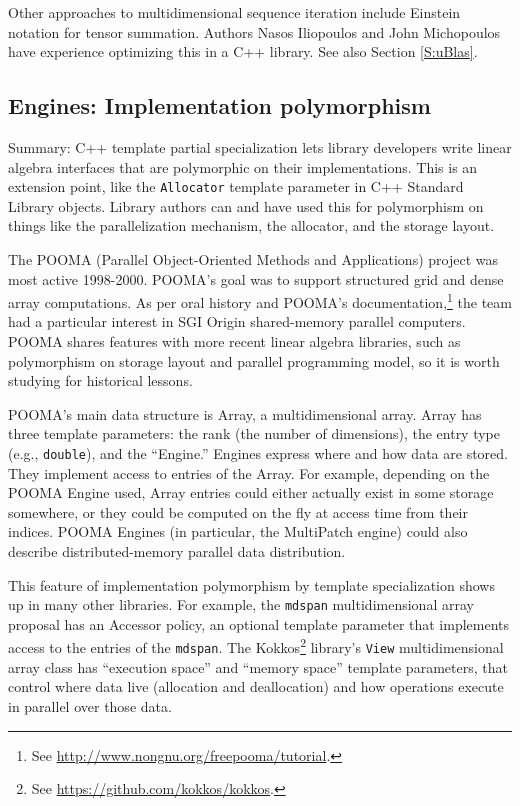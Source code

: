 Other approaches to multidimensional sequence iteration include
Einstein notation for tensor summation.  Authors Nasos Iliopoulos and
John Michopoulos have experience optimizing this in a C++ library.
See also Section \ref{S:uBlas}.

\subsection{Engines: Implementation polymorphism}
\label{SS:features:engine}

Summary: C++ template partial specialization lets library developers
write linear algebra interfaces that are polymorphic on their
implementations.  This is an extension point, like the
\texttt{Allocator} template parameter in C++ Standard Library objects.
Library authors can and have used this for polymorphism on things like
the parallelization mechanism, the allocator, and the storage layout.

The POOMA (Parallel Object-Oriented Methods and Applications) project
was most active 1998-2000. POOMA's goal was to support structured grid
and dense array computations. As per oral history
\cite{hoemmen2018history} and POOMA's documentation,\footnote{See
  \url{http://www.nongnu.org/freepooma/tutorial}.} the team had a
particular interest in SGI Origin shared-memory parallel
computers. POOMA shares features with more recent linear algebra
libraries, such as polymorphism on storage layout and parallel
programming model, so it is worth studying for historical lessons.

POOMA's main data structure is Array, a multidimensional array. Array
has three template parameters: the rank (the number of dimensions),
the entry type (e.g., \texttt{double}), and the ``Engine.''  Engines
express where and how data are stored.  They implement access to
entries of the Array.  For example, depending on the POOMA Engine
used, Array entries could either actually exist in some storage
somewhere, or they could be computed on the fly at access time from
their indices.  POOMA Engines (in particular, the MultiPatch engine)
could also describe distributed-memory parallel data distribution.

This feature of implementation polymorphism by template specialization
shows up in many other libraries.  For example, the \texttt{mdspan}
multidimensional array proposal \cite{P0009r8} has an Accessor policy,
an optional template parameter that implements access to the entries
of the \texttt{mdspan}.  The Kokkos\footnote{See
  \url{https://github.com/kokkos/kokkos}.} library's \texttt{View}
multidimensional array class has ``execution space'' and ``memory
space'' template parameters, that control where data live (allocation
and deallocation) and how operations execute in parallel over those
data.

